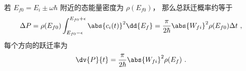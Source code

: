 若 $E_{f0} = E_i \pm \omega\hbar$ 附近的态能量密度为 $\rho(E_{f0})$， 那么总跃迁概率约等于
\begin{equation}
\Delta P = \rho(E_{f0})\int_{E_{f0}-\epsilon}^{E_{f0}+\epsilon}\abs{c_i(t)}^2 \dd{E_f}
= \frac{\pi}{2\hbar} \abs{W_{fi}}^2\rho(E_{f0})\Delta t~,
\end{equation}
每个方向的跃迁率为
\begin{equation}
\dv{P}{t} = \frac{\pi}{2\hbar} \abs{W_{fi}}^2\rho(E_{f})~.
\end{equation}
